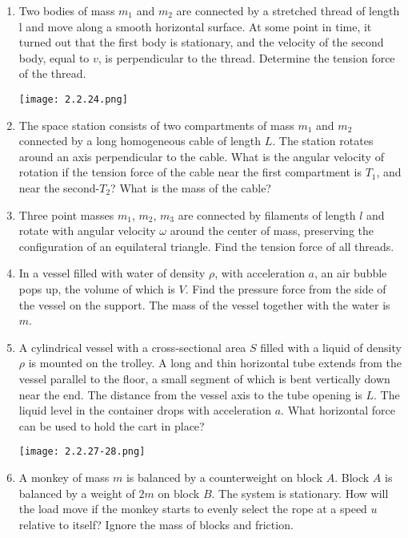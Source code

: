 \documentclass{article}
\begin{document}
\begin{enumerate}[label=2.2.\arabic*]
\item Two bodies of mass $m_1$ and $m_2$ are connected by a stretched thread of length l and move along a smooth horizontal surface. At some point in time, it turned out that the first body is stationary, and the velocity of the second body, equal to $v$, is perpendicular to the thread. Determine the tension force of the thread.

\begin{center}
    \texttt{[image: 2.2.24.png]}
\end{center}

\item The space station consists of two compartments of mass $m_1$ and $m_2$ connected by a long homogeneous cable of length $L$. The station rotates around an axis perpendicular to the cable. What is the angular velocity of rotation if the tension force of the cable near the first compartment is $T_1$, and near the second-$T_2$? What is the mass of the cable?

\item Three point masses $m_1$, $m_2$, $m_3$ are connected by filaments of length $l$ and rotate with angular velocity $\omega$ around the center of mass, preserving the configuration of an equilateral triangle. Find the tension force of all threads.

\item In a vessel filled with water of density $\rho$, with acceleration $a$, an air bubble pops up, the volume of which is $V$. Find the pressure force from the side of the vessel on the support. The mass of the vessel together with the water is $m$.

\item A cylindrical vessel with a cross-sectional area $S$ filled with a liquid of density $\rho$ is mounted on the trolley. A long and thin horizontal tube extends from the vessel parallel to the floor, a small segment of which is bent vertically down near the end. The distance from the vessel axis to the tube opening is $L$. The liquid level in the container drops with acceleration $a$. What horizontal force can be used to hold the cart in place?

\begin{center}
    \texttt{[image: 2.2.27-28.png]}
\end{center}

\item A monkey of mass $m$ is balanced by a counterweight on block $A$. Block $A$ is balanced by a weight of $2m$ on block $B$. The system is stationary. How will the load move if the monkey starts to evenly select the rope at a speed $u$ relative to itself? Ignore the mass of blocks and friction.


\end{enumerate}
\end{document}
